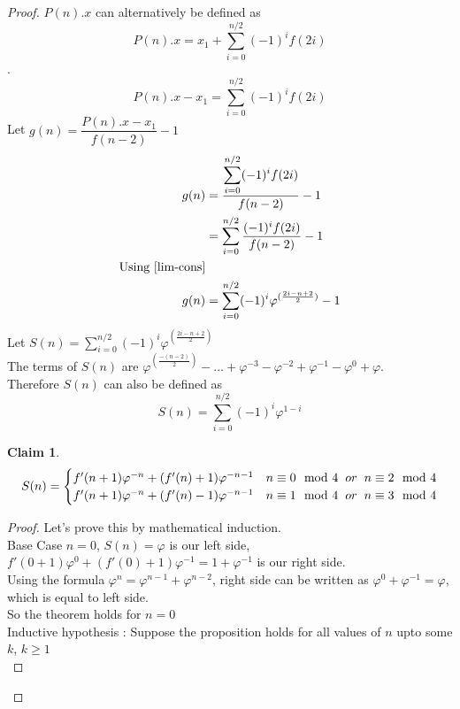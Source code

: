 \documentclass{article}
\newtheorem{claim}{Claim}
\begin{document}
\begin{proof}
$P(n).x$ can alternatively be defined as $$P(n).x = x_1 + \sum_{i = 0}^{n / 2}(-1)^i f(2i)$$.
$$P(n).x - x_1 = \sum_{i = 0}^{n / 2}(-1)^i f(2i)$$
Let $g(n) = \dfrac{P(n).x - x_1}{f(n - 2)} - 1$
\begin{align*}
    g(n) &= \dfrac{\displaystyle\sum_{i = 0}^{n / 2}(-1)^i f(2i)}{f(n - 2)} - 1\\
    &= \sum_{i = 0}^{n / 2}\dfrac{(-1)^i f(2i)}{f(n - 2)} - 1\\
    \text{Using \ref{lim-cons}}\\
    g(n) &= \sum_{i = 0}^{n / 2}(-1)^i \varphi^{(\frac{2i - n + 2}{2})}- 1
\end{align*}
Let $S(n) = \displaystyle\sum_{i = 0}^{n/2}(-1)^i \varphi^{(\frac{2i-n+2}{2})}$\\
The terms of $S(n)$ are $\varphi^{(\frac{-(n - 2)}{2})} - \ldots + \varphi^{-3} - \varphi^{-2} + \varphi^{-1} -\varphi^0 + \varphi$.\\
Therefore $S(n)$ can also be defined as $$S(n) = \sum_{i = 0}^{n / 2}(-1)^i \varphi^{1 - i}$$
\begin{claim}
	\begin{equation*}
	S(n) = \begin{cases}
	f'(n + 1)\varphi^{-n} + (f'(n) + 1)\varphi^{-n-1} & n\equiv0\mod4\hspace{2mm} or\hspace{2mm} n\equiv2\mod4\\
	f'(n + 1)\varphi^{-n} + (f'(n) - 1)\varphi^{-n-1} &
	n\equiv1\mod4\hspace{2mm} or\hspace{2mm} n\equiv3\mod4
	\end{cases}
	\end{equation*}
\end{claim}
\begin{proof}
	Let's prove this by mathematical induction.\\
	Base Case $n=0$, $S(n) = \varphi$ is our left side, $f'(0 + 1)\varphi^0 + (f'(0) + 1)\varphi^{-1} = 1 + \varphi^{-1}$ is our right side.\\
	Using the formula $\varphi^n = \varphi^{n - 1} + \varphi^{n - 2}$\cite{PowerP}, right side can be written as $\varphi^0 + \varphi^{-1} = \varphi$, which is equal to left side.\\
	So the theorem holds for $n = 0$\\
	Inductive hypothesis : Suppose the proposition holds for all values of $n$ upto some $k$, $k \geq 1$\\

\end{proof}
\end{proof}
\end{document}
